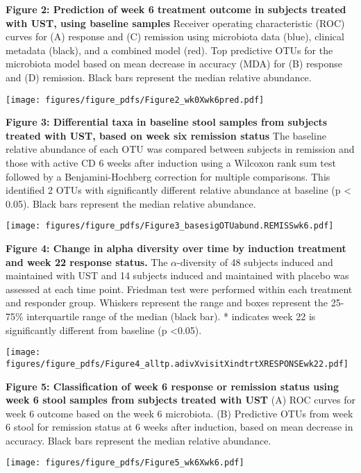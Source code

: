 \documentclass[12pt,]{article}
\begin{document}
\textbf{Figure 2: Prediction of week 6 treatment outcome in subjects
treated with UST, using baseline samples} Receiver operating
characteristic (ROC) curves for (A) response and (C) remission using
microbiota data (blue), clinical metadata (black), and a combined model
(red). Top predictive OTUs for the microbiota model based on mean
decrease in accuracy (MDA) for (B) response and (D) remission. Black
bars represent the median relative abundance.

\texttt{[image: figures/figure\_pdfs/Figure2\_wk0Xwk6pred.pdf]}

\newpage

\textbf{Figure 3: Differential taxa in baseline stool samples from
subjects treated with UST, based on week six remission status} The
baseline relative abundance of each OTU was compared between subjects in
remission and those with active CD 6 weeks after induction using a
Wilcoxon rank sum test followed by a Benjamini-Hochberg correction for
multiple comparisons. This identified 2 OTUs with significantly
different relative abundance at baseline (p \textless{} 0.05). Black
bars represent the median relative abundance.

\texttt{[image: figures/figure\_pdfs/Figure3\_basesigOTUabund.REMISSwk6.pdf]}

\newpage

\textbf{Figure 4: Change in alpha diversity over time by induction
treatment and week 22 response status.} The \({\alpha}\)-diversity of 48
subjects induced and maintained with UST and 14 subjects induced and
maintained with placebo was assessed at each time point. Friedman test
were performed within each treatment and responder group. Whiskers
represent the range and boxes represent the 25-75\% interquartile range
of the median (black bar). * indicates week 22 is significantly
different from baseline (p \textless{}0.05).

\texttt{[image: figures/figure\_pdfs/Figure4\_alltp.adivXvisitXindtrtXRESPONSEwk22.pdf]}

\newpage

\textbf{Figure 5: Classification of week 6 response or remission status
using week 6 stool samples from subjects treated with UST} (A) ROC
curves for week 6 outcome based on the week 6 microbiota. (B) Predictive
OTUs from week 6 stool for remission status at 6 weeks after induction,
based on mean decrease in accuracy. Black bars represent the median
relative abundance.

\texttt{[image: figures/figure\_pdfs/Figure5\_wk6Xwk6.pdf]}
\end{document}
